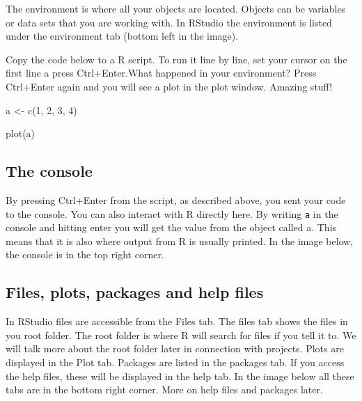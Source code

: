 \documentclass[
  11pt,
  letterpaper,
]{scrbook}
\newenvironment{Shaded}{\begin{snugshade}}{\end{snugshade}}
\newcommand{\DecValTok}[1]{\textcolor[rgb]{0.68,0.00,0.00}{#1}}
\newcommand{\FunctionTok}[1]{\textcolor[rgb]{0.28,0.35,0.67}{#1}}
\newcommand{\NormalTok}[1]{\textcolor[rgb]{0.00,0.23,0.31}{#1}}
\newcommand{\OtherTok}[1]{\textcolor[rgb]{0.00,0.23,0.31}{#1}}
\begin{document}
The environment is where all your objects are located. Objects can be
variables or data sets that you are working with. In RStudio the
environment is listed under the environment tab (bottom left in the
image).

Copy the code below to a R script. To run it line by line, set your
cursor on the first line a press Ctrl+Enter.What happened in your
environment? Press Ctrl+Enter again and you will see a plot in the plot
window. Amazing stuff!

\begin{Shaded}
\begin{Highlighting}[numbers=left,,]
\NormalTok{a }\OtherTok{\textless{}{-}} \FunctionTok{c}\NormalTok{(}\DecValTok{1}\NormalTok{, }\DecValTok{2}\NormalTok{, }\DecValTok{3}\NormalTok{, }\DecValTok{4}\NormalTok{)}

\FunctionTok{plot}\NormalTok{(a)}
\end{Highlighting}
\end{Shaded}

\hypertarget{the-console}{%
\subsection{The console}\label{the-console}}

By pressing Ctrl+Enter from the script, as described above, you sent
your code to the console. You can also interact with R directly here. By
writing \texttt{a} in the console and hitting enter you will get the
value from the object called a. This means that it is also where output
from R is usually printed. In the image below, the console is in the top
right corner.

\hypertarget{files-plots-packages-and-help-files}{%
\subsection{Files, plots, packages and help
files}\label{files-plots-packages-and-help-files}}

In RStudio files are accessible from the Files tab. The files tab shows
the files in you root folder. The root folder is where R will search for
files if you tell it to. We will talk more about the root folder later
in connection with projects. Plots are displayed in the Plot tab.
Packages are listed in the packages tab. If you access the help files,
these will be displayed in the help tab. In the image below all these
tabs are in the bottom right corner. More on help files and packages
later.
\end{document}
